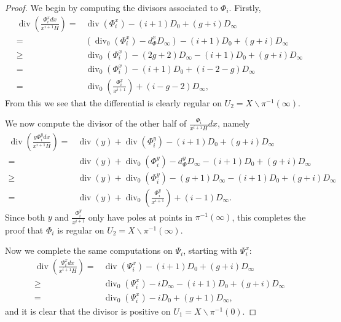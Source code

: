 \documentclass[draft, 11pt]{article} %
\theoremstyle{plain}
\theoremstyle{remark}
\DeclareMathOperator{\di}{div}
\begin{document}
\begin{proof}
We begin by computing the divisors associated to $\Phi_i$.
Firstly,
\begin{align*}
\di \left( \frac{\Phi_i^x dx}{x^{i+1} H} \right)  = &  \di(\Phi_i^x) -(i+1)D_0 + (g+i)D_\infty\\
 = & \left( \di_0(\Phi_i^x) -d_\Phi^xD_\infty\right) -(i+1)D_0 + (g+i)D_\infty\\
 \geq & \di_0(\Phi_i^x) - (2g+2)D_\infty - (i+1)D_0 + (g+i)D_\infty \\
 = &  \di_0(\Phi_i^x) - (i+1)D_0 + (i-2-g)D_\infty \\
 =  & \di_0 \left( \frac{\Phi_i^x}{x^{i+1}} \right) + (i-g-2)D_\infty,
\end{align*}
From this we see that the differential is clearly regular on $U_2 = X \backslash \pi^{-1}(\infty)$.

We now compute the divisor of the other half of $\frac{\Phi_i}{x^{i+1}H}dx$, namely
\begin{align*}
\di\left(\frac{y\Phi_i^y dx}{x^{i+1}H} \right)  = & \di(y) + \di(\Phi_i^y) -(i+1)D_0 + (g+i)D_\infty\\
 = & \di(y) + \di_0(\Phi_i^y) - d_\Phi^yD_\infty -(i+1)D_0 + (g+i)D_\infty \\
 \geq & \di(y) + \di_0(\Phi_i^y) - (g+1)D_\infty - (i+1)D_0 + (g+i)D_\infty \\
 = & \di(y) + \di_0\left(\frac{\Phi_i^y}{x^{i+1}} \right) + (i-1)D_\infty.
\end{align*}
Since both $y$ and $\frac{\Phi_i^y}{x^{i+1}}$ only have poles at points in $\pi^{-1}(\infty)$, this completes the proof that $\Phi_i$ is regular on $U_2 = X \backslash \pi^{-1}(\infty)$.

Now we complete the same computations on $\Psi_i$, starting with $\Psi_i^x$:
\begin{align*}
\di\left( \frac{\Psi_i^x dx}{x^{i+1}H} \right)  = &  \di(\Psi_i^x)  - (i+1)D_0 + (g+i)D_\infty \\
 \geq &  \di_0(\Psi_i^x ) - iD_\infty - (i+1)D_0 + (g+i)D_\infty \\
 = &  \di_0(\Psi_i^x) - iD_0 + (g+1)D_\infty,
\end{align*}
and it is clear that the divisor is positive on $U_1 = X \backslash \pi^{-1}(0)$.


\end{proof}
\end{document}
